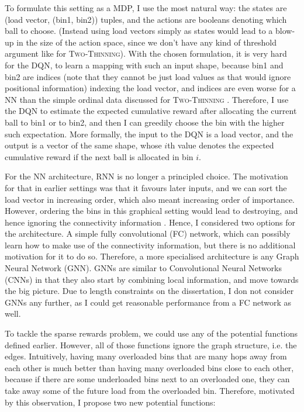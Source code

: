 To formulate this setting as a MDP, I use the most natural way: the states are (load vector, (bin1, bin2)) tuples, and the actions are booleans denoting which ball to choose. (Instead using load vectors simply as states would lead to a blow-up in the size of the action space, since we don't have any kind of threshold argument like for \textsc{Two-Thinning}). With the chosen formulation, it is very hard for the DQN, to learn a mapping with such an input shape, because bin1 and bin2 are indices (note that they cannot be just load values as that would ignore positional information) indexing the load vector, and indices are even worse for a NN than the simple ordinal data discussed for \textsc{Two-Thinning} . Therefore, I use the DQN to estimate the expected cumulative reward after allocating the current ball to bin1 or to bin2, and then I can greedily choose the bin with the higher such expectation. More formally, the input to the DQN is a load vector, and the output is a vector of the same shape, whose $i$th value denotes the expected cumulative reward if the next ball is allocated in bin $i$.  


For the NN architecture, RNN is no longer a principled choice. The motivation for that in earlier settings was that it favours later inputs, and we can sort the load vector in increasing order, which also meant increasing order of importance. However, ordering the bins in this graphical setting would lead to destroying, and hence ignoring the connectivity information . Hence, I considered two options for the architecture. A simple fully convolutional (FC) network, which can possibly learn how to make use of the connectivity information, but there is no additional motivation for it to do so. Therefore, a more specialised architecture is any Graph Neural Network (GNN). GNNs are similar to Convolutional Neural Networks (CNNs) in that they also start by combining local information, and move towards the big picture. Due to length constraints on the dissertation, I don not consider GNNs any further, as I could get reasonable performance from a FC network as well. 



To tackle the sparse rewards problem, we could use any of the potential functions defined earlier. However, all of those functions ignore the graph structure, i.e. the edges. Intuitively, having many overloaded bins that are many hops away from each other is much better than having many overloaded bins close to each other, because if there are some underloaded bins next to an overloaded one, they can take away some of the future load from the overloaded bin. Therefore, motivated by this observation, I propose two new potential functions:


